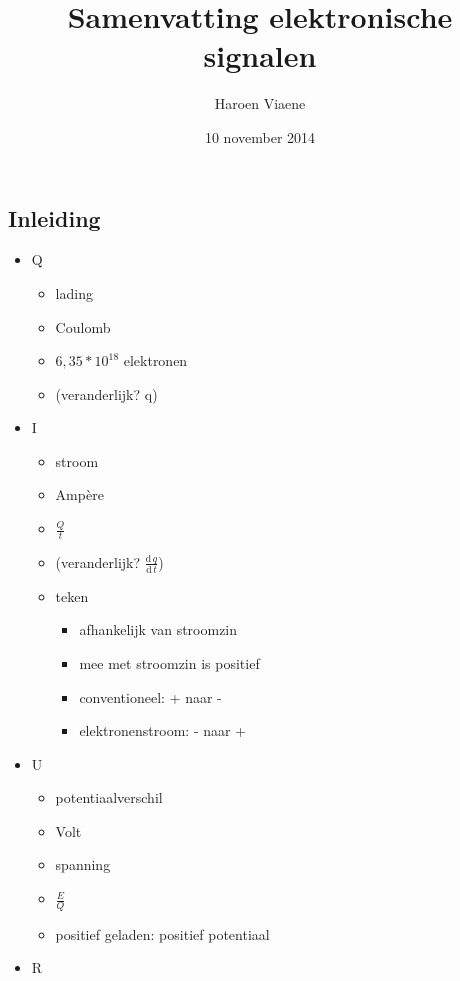 \documentclass[11pt]{article}
\title{Samenvatting elektronische signalen}
\author{Haroen Viaene}
\date{10 november 2014}
\let\originalitem\item
\renewcommand{\item}{\originalitem[]}
\renewcommand{\d}{\textrm{d}\,}
\newcommand{\Newpage}{\end{preview}\begin{preview}}
\begin{document}
\begin{preview}


\maketitle

\tableofcontents

\Newpage

\section{Inleiding}

\begin{itemize}
\item Q
	\begin{itemize}
		\item{lading}
		\item Coulomb
		\item $6,35 * 10^{18}$ elektronen
		\item (veranderlijk? q)
	\end{itemize}
\item I
	\begin{itemize} 
		\item stroom
		\item Amp\`ere
		\item $\frac{Q}{t}$
		\item (veranderlijk? $\frac{\d q}{\d t}$)
		\item teken
			\begin{itemize}
				\item afhankelijk van stroomzin
				\item mee met stroomzin is positief
				\item conventioneel: + naar -
				\item elektronenstroom: - naar +
			\end{itemize}
	\end{itemize}
\item U
	\begin{itemize}
		\item potentiaalverschil
		\item Volt
		\item spanning
		\item $\frac{E}{Q}$
		\item positief geladen: positief potentiaal
	\end{itemize}
\item R

\end{itemize}
\end{preview}
\end{document}
